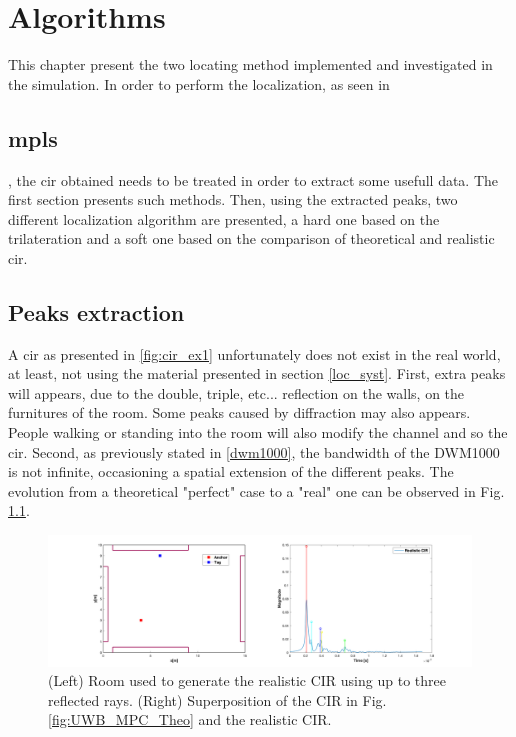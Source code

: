 \chapter{Algorithms}

This chapter present the two locating method implemented and investigated in the simulation. In order to perform the localization, as seen in \section{mpls}, the \gls{cir} obtained needs to be treated in order to extract some usefull data. The first section presents such methods. Then, using the extracted peaks, two different localization algorithm are presented, a hard one based on the trilateration and a soft one based on the comparison of theoretical and realistic \gls{cir}.

\section{Peaks extraction}

A \gls{cir} as presented in \ref{fig:cir_ex1} unfortunately does not exist in the real world, at least, not using the material presented in section \ref{loc_syst}. First, extra peaks will appears, due to the double, triple, etc...  reflection on the walls, on the furnitures of the room. Some peaks caused by diffraction may also appears. People walking or standing into the room will also modify the channel and so the \gls{cir}. Second, as previously stated in \ref{dwm1000}, the bandwidth of the DWM1000 is not infinite, occasioning a spatial extension of the different peaks. The evolution from a theoretical "perfect" case to a "real" one can be observed in Fig. \ref{fig:peaks_real}.

\begin{figure}[H]
\centering
\includegraphics[width=\linewidth]{Images/cir_theo_real.png}
\caption{(Left) Room used to generate the realistic CIR using up to three reflected rays. (Right) Superposition of the CIR in Fig. \ref{fig:UWB_MPC_Theo} and the realistic CIR. \label{fig:peaks_real}}
\end{figure}

